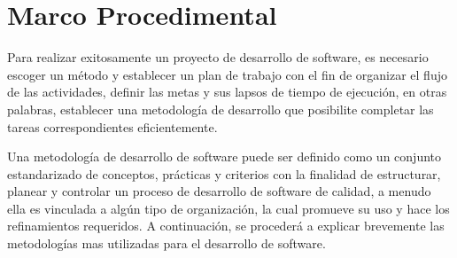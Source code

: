 \chapter{Marco Procedimental}
\par Para realizar exitosamente un proyecto de desarrollo de software, es necesario escoger un método y establecer un plan de trabajo con el fin de organizar el flujo de las actividades, definir las metas y sus lapsos de tiempo de ejecución, en otras palabras, establecer una metodología de desarrollo que posibilite completar las tareas correspondientes eficientemente. \\
\par Una metodología de desarrollo de software puede ser definido como un conjunto estandarizado de conceptos, prácticas y criterios con la finalidad de estructurar, planear y controlar un proceso de desarrollo de software de calidad, a menudo ella es vinculada a algún tipo de organización, la cual promueve su uso y hace los refinamientos requeridos. A continuación, se procederá a explicar brevemente las metodologías mas utilizadas para el desarrollo de software.

